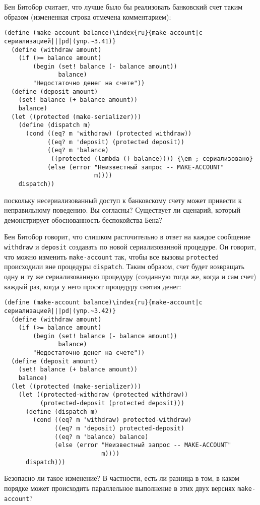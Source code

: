 \begin{exercise}{3.41}\label{EX3.41}%
Бен Битобор считает, что лучше было бы реализовать
банковский счет таким образом (измененная строка отмечена
комментарием):

\begin{Verbatim}[fontsize=\small]
(define (make-account balance)\index{ru}{make-account|с сериализацией|||pd|(упр.~3.41)}
  (define (withdraw amount)
    (if (>= balance amount)
        (begin (set! balance (- balance amount))
               balance)
        "Недостаточно денег на счете"))
  (define (deposit amount)
    (set! balance (+ balance amount))
    balance)
  (let ((protected (make-serializer)))
    (define (dispatch m)
      (cond ((eq? m 'withdraw) (protected withdraw))
            ((eq? m 'deposit) (protected deposit))
            ((eq? m 'balance)
             ((protected (lambda () balance)))) {\em ; сериализовано}
            (else (error "Неизвестный запрос -- MAKE-ACCOUNT"
                         m))))
    dispatch))
\end{Verbatim}
поскольку несериализованный доступ к банковскому счету может привести
к неправильному поведению.  Вы согласны?  Существует ли сценарий,
который демонстрирует обоснованность беспокойства Бена?
\end{exercise}
\begin{exercise}{3.42}\label{EX3.42}%
Бен Битобор говорит, что слишком расточительно в ответ
на каждое сообщение {\tt with\-draw} и {\tt deposit}
создавать по новой сериализованной процедуре.  Он говорит, что можно
изменить {\tt make-account} так, чтобы все вызовы
{\tt protected} происходили вне процедуры
{\tt dispatch}. Таким образом, счет будет возвращать одну и ту
же сериализованную процедуру (созданную тогда же, когда и сам счет)
каждый раз, когда у него просят процедуру снятия денег:

\begin{Verbatim}[fontsize=\small]
(define (make-account balance)\index{ru}{make-account|с сериализацией|||pd|(упр.~3.42)}
  (define (withdraw amount)
    (if (>= balance amount)
        (begin (set! balance (- balance amount))
               balance)
        "Недостаточно денег на счете"))
  (define (deposit amount)
    (set! balance (+ balance amount))
    balance)
  (let ((protected (make-serializer)))
    (let ((protected-withdraw (protected withdraw))
          (protected-deposit (protected deposit)))
      (define (dispatch m)
        (cond ((eq? m 'withdraw) protected-withdraw)
              ((eq? m 'deposit) protected-deposit)
              ((eq? m 'balance) balance)
              (else (error "Неизвестный запрос -- MAKE-ACCOUNT"
                           m))))
      dispatch)))
\end{Verbatim}
Безопасно ли такое изменение?  В частности, есть ли разница в том,
в каком порядке может происходить параллельное выполнение в этих двух
версиях {\tt make-account}?
\end{exercise}


